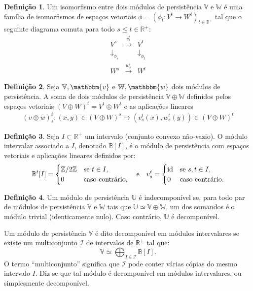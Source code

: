 \documentclass[12pt, a4paper]{article}
\theoremstyle{plain}
\theoremstyle{definition}
\newtheorem{definition}{Definição}[section]
\theoremstyle{remark}
\begin{document}
\begin{definition}
    Um isomorfismo entre dois módulos de persistência $\mathbb{V}$ e $\mathbb{W}$ é uma família de isomorfismos de espaços vetoriais $\phi = (\phi_t: V^t \to W^t)_{t \in \mathbb{R}^+}$ tal que o seguinte diagrama comuta para todo $s \leq t \in \mathbb{R}^+$:
    \[
        \begin{array}{ccc}
        V^s & \xrightarrow{v_s^t} & V^t \\
        \downarrow_{\phi_s} & & \downarrow_{\phi_t} \\
        W^s & \xrightarrow{w_s^t} & W^t
        \end{array}
    \]
\end{definition}

\begin{definition}
    Seja $\mathbb{V}, \mathbbm{v}$ e $\mathbb{W}, \mathbbm{w}$ dois módulos de persistência. A soma de dois módulos de persistência $\mathbb{V} \oplus \mathbb{W}$ definidos pelos espaços vetoriais $\left(V \oplus W\right)^t=V^t\oplus W^t$ e as aplicações lineares
    \begin{align*}
        (v\oplus w)_s^t:(x,y) \in \left(V \oplus W\right)^s \longmapsto (v_s^t(x), w_s^t(y)) \in \left(V \oplus W\right)^t
    \end{align*}

\end{definition}

\begin{definition}
    Seja $I \subset \mathbb{R}^+$ um intervalo (conjunto convexo não-vazio). O módulo intervalar associado a $I$, denotado $\mathbb{B}[I]$, é o módulo de persistência com espaços vetoriais e aplicações lineares definidos por:
    \[
        \mathbb{B}^t[I] = \begin{cases} \mathbb{Z}/2\mathbb{Z} & \textnormal{se } t \in I, \\ 0 & \textnormal{caso contrário,} \end{cases}
        \quad \textnormal{e} \quad
        v_s^t = \begin{cases} \mathrm{id} & \textnormal{se } s, t \in I, \\ 0 & \textnormal{caso contrário.} \end{cases}
    \]
\end{definition}

\begin{definition}
    Um módulo de persistência $\mathbb{U}$ é indecomponível se, para todo par de módulos de persistência $\mathbb{V}$ e $\mathbb{W}$ tais que $\mathbb{U} \simeq \mathbb{V} \oplus \mathbb{W}$, um dos somandos é o módulo trivial (identicamente nulo). Caso contrário, $\mathbb{U}$ é decomponível.

    Um módulo de persistência $\mathbb{V}$ é dito decomponível em módulos intervalares se existe um multiconjunto $\mathcal{I}$ de intervalos de $\mathbb{R}^+$ tal que:
    \[
        \mathbb{V} \simeq \bigoplus_{I \in \mathcal{I}} \mathbb{B}[I].
    \]
    O termo \enquote{multiconjunto} significa que $\mathcal{I}$ pode conter várias cópias do mesmo intervalo $I$. Diz-se que tal módulo é decomponível em módulos intervalares, ou simplesmente decomponível.
\end{definition}
\end{document}
